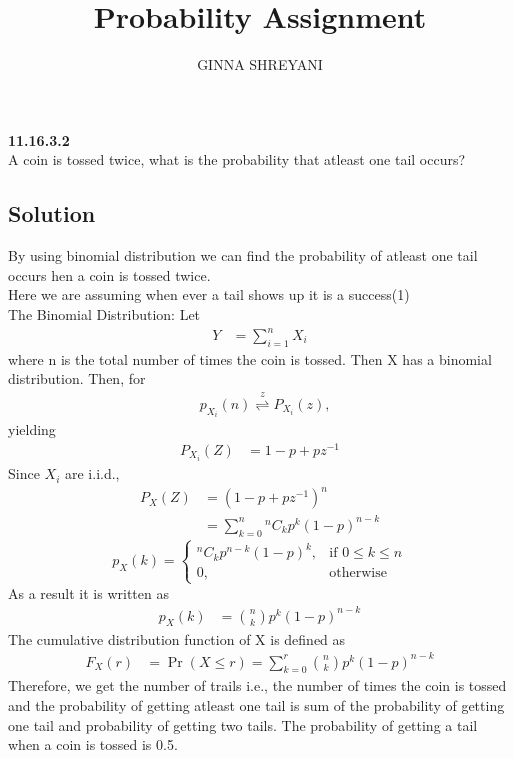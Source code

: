 \documentclass[12pt,twocolumn]{article}
\title{
Probability Assignment
}
\author{GINNA SHREYANI}
\date{}
\newcommand*{\Comb}[2]{{}^{#1}C_{#2}}%
\begin{document}
\maketitle

\textbf{11.16.3.2}\\
A coin is tossed twice, what is the probability that atleast one tail occurs?\\
\subsection*{Solution}
By using binomial distribution we can find the probability of atleast one tail occurs hen a coin is tossed twice.\\
Here we are assuming when ever a tail shows up it is a success(1)\\
The Binomial Distribution: Let
\begin{align}
	Y &= \sum_{i=1}^n X_i
         \label{eq-1}
\end{align}
where n is the total number of times the coin is tossed. Then X has a binomial distribution. Then, for
\begin{align}
	&p_{X_i}(n){\stackrel{z}{\rightleftharpoons}}P_{X_i}(z),
     \label{eq-2}
\end{align}
yielding
\begin{align}
	P_{X_i}(Z) &= 1-p+pz^{-1}
	\label{eq-3}
\end{align}
Since $X_i$ are i.i.d.,
\begin{align}
	P_X(Z)&=(1-p+pz^{-1})^n\\
	&=\sum_{k=0}^n{\Comb{n}{k}p^{k}(1-p)^{n-k}}
\end{align}
\[
	p_X(k)=
	\begin{cases}
		\Comb{n}{k}p^{n-k}(1-p)^k,& \text{if } 0\leq k\leq n\\
		0,& \text{otherwise}
	\end{cases}
\]
As a result it is written as
\begin{align}
	\label{eq-6}
	p_X(k) &=\binom nk p^{k}(1-p)^{n-k}
\end{align}
The cumulative distribution function of X is defined as
\begin{align}
	F_X(r) &=\Pr(X\leq r) = \sum_{k=0}^r\binom nk p^{k}(1-p)^{n-k}
	\label{eq-7}
\end{align}
Therefore, we get the number of trails i.e., the number of times the coin is tossed and the probability of getting atleast one tail is sum of the probability of getting one tail and probability of getting two tails.
The probability of getting a tail when a coin is tossed is 0.5.
\end{document}
